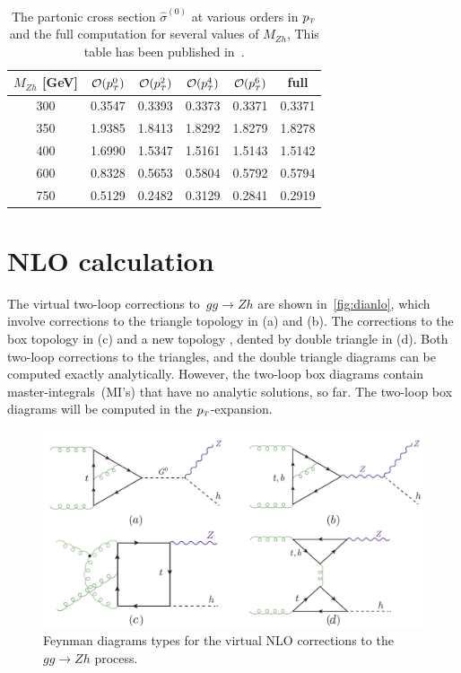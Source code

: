 \begin{table}
	\renewcommand{\arraystretch}{1.2}
	\centering
	\begin{tabular}{| c| c | c | c| c| c|} \hline
		\rowcolor{lightgray}  $M_{Zh}$ [GeV]  & $\mathcal{O}(p_{\scriptscriptstyle T}^0)$ & $\mathcal{O}(p_{\scriptscriptstyle T}^2)$ & $\mathcal{O}(p_{\scriptscriptstyle T}^4)$ & $\mathcal{O}(p_{\scriptscriptstyle T}^6)$ & full \\ \hline 
		\cellcolor{lightgray} 300 & 0.3547 & 0.3393 &  0.3373 &0.3371& 0.3371 \\
		\cellcolor{lightgray} 350 & 1.9385 & 1.8413& 1.8292 &1.8279& 1.8278 \\
		\cellcolor{lightgray} 400 & 1.6990 & 1.5347 & 1.5161 &1.5143& 1.5142 \\
		\cellcolor{lightgray} 600 & 0.8328 & 0.5653 & 0.5804 &0.5792&  0.5794 \\ 
		\cellcolor{lightgray} 750 & 0.5129 & 0.2482 & 0.3129 & 0.2841 &  0.2919 \\ \hline
	\end{tabular}
	\caption{The partonic cross section $\hat{\sigma}^{(0)}$ at
		various orders in $p_{\scriptscriptstyle T}$ and the full computation for several values of $M_{Zh}$, This table has been published in~\cite{Alasfar:2021ppe}. \label{tab:partonic}}
\end{table}
\section{ NLO calculation }
\label{sec:quattro}
The virtual two-loop corrections to~$ gg\to Zh$ are shown in~\autoref{fig:dianlo}, which involve corrections to the triangle topology in (a) and (b). The corrections to the box topology in (c) and a new topology , dented by double triangle in (d). Both two-loop corrections to the triangles, and the double triangle diagrams can be computed exactly analytically. However, the two-loop box diagrams contain master-integrals~(MI's) that have no analytic solutions, so far. The two-loop box diagrams will be computed in the $p_{\scriptscriptstyle T}$-expansion.
\begin{figure}[htpb!]
	\begin{center}
		\includegraphics[width=12cm]{./figures/Feynman_NL0}
		\caption{Feynman diagrams types for the virtual NLO corrections to the $gg \to Zh$ process. }
		\label{fig:dianlo}
	\end{center}
\end{figure}
